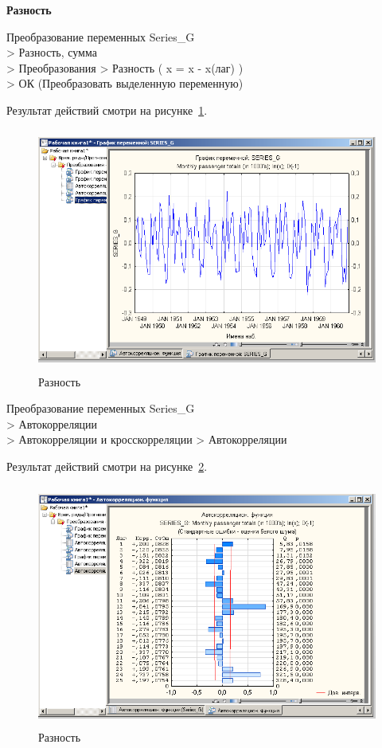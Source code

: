 
\newpage

\begin{center}
  \textbf{Разность}
\end{center}

Преобразование переменных Series\_G\\
> Разность, сумма\\
> Преобразования  > Разность ( x = x - x(лаг) )\\
> ОК (Преобразовать выделенную переменную)

Результат действий смотри на рисунке~\ref{fig:6}.

\begin{figure}[!h]
  \centering

  \includegraphics[height=8cm]
  {inc/Series_G/6.PNG}

  \caption{Разность}

  \label{fig:6}
\end{figure}

Преобразование переменных Series\_G\\
> Автокорреляции\\
> Автокорреляции и кросскорреляции > Автокорреляции

Результат действий смотри на рисунке~\ref{fig:7}.

\begin{figure}[!h]
  \centering

  \includegraphics[height=8cm]
  {inc/Series_G/7.PNG}

  \caption{Разность}

  \label{fig:7}
\end{figure}

